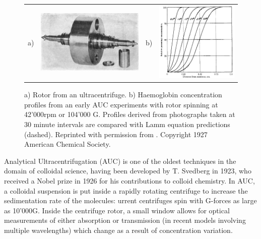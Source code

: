 \documentclass{doctoral}
\begin{document}
\begin{figure}[h]
    \centering
    \begin{tabular}{llll}
        a)                                                                                      &
        \includegraphics[height=0.3\linewidth,valign=t]{figures/ultracentrifugation_device.png} &
        b)                                                                                      &
        \includegraphics[height=0.3\linewidth,valign=t]{figures/ultracentrifugation_results.png}
    \end{tabular}

    \caption{a) Rotor from an ultracentrifuge. b) Haemoglobin concentration profiles from an early AUC experiments with rotor spinning at 42'000rpm or 104'000 G.
        Profiles derived from photographs taken at 30 minute intervals are compared with Lamm equation predictions (dashed).
        Reprinted with permission from \cite{Svedberg_1927}.
        Copyright 1927 American Chemical Society.
    }
    \label{fig:auc_diagram}
\end{figure}

Analytical Ultracentrifugation (AUC) is one of the oldest techniques in the domain of colloidal science, having been developed by T.
Svedberg in 1923, who received a Nobel prize in 1926 for his contributions to colloid chemistry.
In AUC, a colloidal suspension is put inside a rapidly rotating centrifuge to increase the sedimentation rate of the molecules: urrent centrifuges spin with G-forces as large as 10'000G.
Inside the centrifuge rotor, a small window allows for optical measurements of either absorption or transmission (in recent models involving multiple wavelengths) which change as a result of concentration variation.
\end{document}
